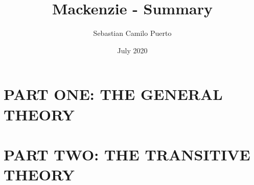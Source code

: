 \documentclass{report}
\title{Mackenzie - Summary}
\author{Sebastian Camilo Puerto}
\date{July 2020}
\begin{document}
\maketitle

\tableofcontents

\chapter{PART ONE: THE GENERAL THEORY}











\chapter{PART TWO: THE TRANSITIVE THEORY}


\end{document}

